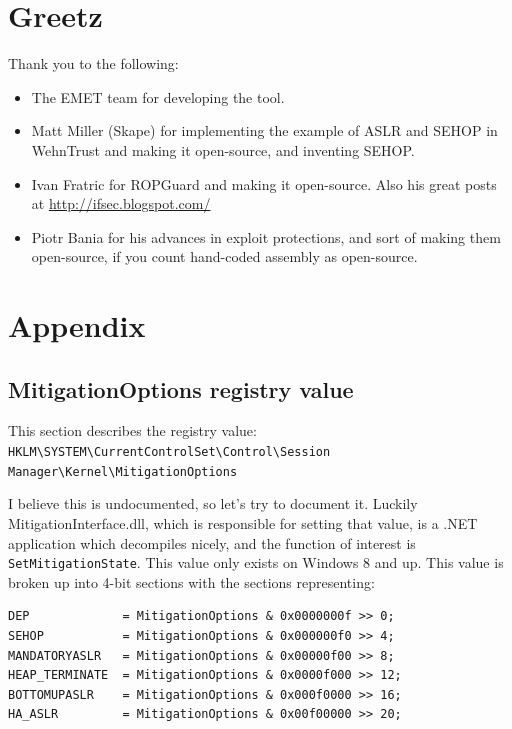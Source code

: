 \documentclass[]{article}
\begin{document}
\section{Greetz}\label{greetz}
Thank you to the following:
\begin{itemize}
\item
  The EMET team for developing the tool.
\item
  Matt Miller (Skape) for implementing the example of ASLR and SEHOP in WehnTrust and making it open-source, and inventing SEHOP.
\item
  Ivan Fratric for ROPGuard and making it open-source. Also his great posts at \url{http://ifsec.blogspot.com/}
\item
  Piotr Bania for his advances in exploit protections, and sort of making them open-source, if you count hand-coded assembly as open-source.
\end{itemize}





\section{Appendix}\label{appendix}

\subsection{MitigationOptions registry value}\label{MitigationOptions}

This section describes the registry value:\\
\texttt{HKLM\textbackslash{}SYSTEM\textbackslash{}CurrentControlSet\textbackslash{}Control\textbackslash{}Session Manager\textbackslash{}Kernel\textbackslash{}MitigationOptions}

I believe this is undocumented, so let's try to document it. Luckily
MitigationInterface.dll, which is responsible for setting that value, is
a .NET application which decompiles nicely, and the
function of interest is \texttt{SetMitigationState}. This value only
exists on Windows 8 and up. This value is broken up into 4-bit sections
with the sections representing:

\begin{verbatim}
DEP             = MitigationOptions & 0x0000000f >> 0;
SEHOP           = MitigationOptions & 0x000000f0 >> 4;
MANDATORYASLR   = MitigationOptions & 0x00000f00 >> 8;
HEAP_TERMINATE  = MitigationOptions & 0x0000f000 >> 12;
BOTTOMUPASLR    = MitigationOptions & 0x000f0000 >> 16;
HA_ASLR         = MitigationOptions & 0x00f00000 >> 20;
\end{verbatim}
\end{document}
